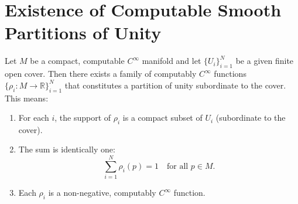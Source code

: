 \documentclass[12pt, a4paper]{article}
\begin{document}
\section*{Existence of Computable Smooth Partitions of Unity}

\begin{claim}
Let $M$ be a compact, computable $C^\infty$ manifold and let $\{ U_i \}_{i=1}^N$ be a given finite open cover. Then there exists a family of computably $C^\infty$ functions $\{ \rho_i : M \to \mathbb{R} \}_{i=1}^N$ that constitutes a partition of unity subordinate to the cover. This means:
\begin{enumerate}
    \item For each $i$, the support of $\rho_i$ is a compact subset of $U_i$ (subordinate to the cover).
    \item The sum is identically one:
    \[
    \sum_{i=1}^N \rho_i(p) = 1 \quad \text{for all } p \in M.
    \]
    \item Each $\rho_i$ is a non-negative, computably $C^\infty$ function.
\end{enumerate}
\end{claim}
\end{document}
